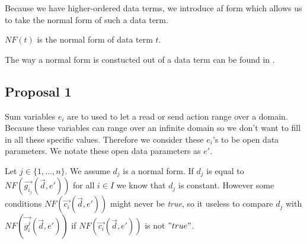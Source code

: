 \documentclass[a4paper,10pt]{article}
\newcommand{\lpe}{linear process equation}
\newcommand{\ovr}{\overrightarrow}
\newcommand{\pp}{process parameter}
\newcommand{\pps}{process parameters}
\newcommand{\ti}{\textit}
\begin{document}
Because we have  higher-ordered data terms, we introduce af form which allows us to take the normal form of such a data term. 
\begin{defn} 
$NF(t)$ is the normal form of data term $t$. 
\end{defn}
The way a normal form is constucted out of a data term can be found in \cite{rewrite}.





\subsection{Proposal 1} \label{sec:prop1}
Sum variables $e_i$ are to used to let a read or send action range over a domain. Because these variables can range over an infinite domain so we don't want to fill in all these specific values. Therefore we consider these $e_i$'s to be open data parameters. We notate these open data parameters as $e'$.

Let $j \in \lbrace 1, \ldots,  n \rbrace $. We assume $d_j$ is a normal form. If $d_j$ is equal to $NF(\ovr{g_{i_j}}(\ovr{d},e'))$ for all $i \in I$ we know that $d_j$ is constant. However some conditions $NF(\ovr{c_i}(\ovr{d},e'))$ might never be \ti{true}, so it useless to compare $d_j$ with $NF(\ovr{g_i^j}(\ovr{d},e'))$  if $NF(\ovr{c_i}(\ovr{d},e'))$ is not  $"true"$. \\
\end{document}
